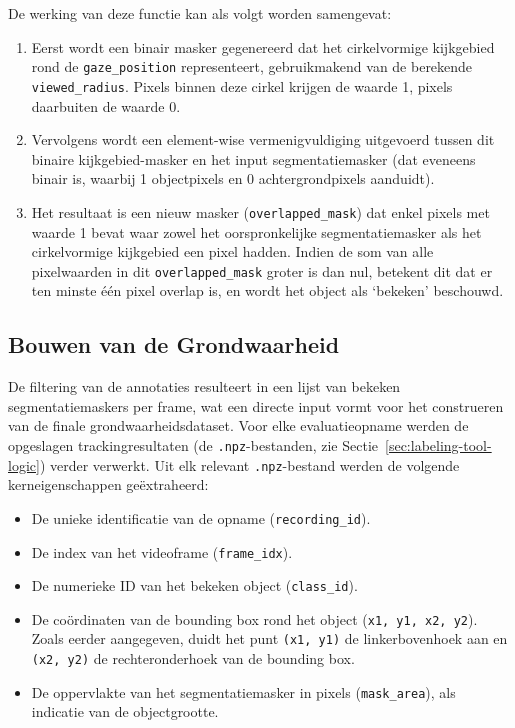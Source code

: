 De werking van deze functie kan als volgt worden samengevat:
\begin{enumerate}
  \item Eerst wordt een binair masker gegenereerd dat het cirkelvormige kijkgebied rond de \texttt{gaze\_position} representeert, 
  gebruikmakend van de berekende\\ \texttt{viewed\_radius}. Pixels binnen deze cirkel krijgen de waarde 1, pixels daarbuiten de waarde 0.
  \item Vervolgens wordt een element-wise vermenigvuldiging uitgevoerd tussen dit binaire kijkgebied-masker 
  en het input segmentatiemasker (dat eveneens binair is, waarbij 1 objectpixels en 0 achtergrondpixels aanduidt). 
  \item Het resultaat is een nieuw masker (\texttt{overlapped\_mask}) dat enkel pixels met waarde 1 bevat waar 
  zowel het oorspronkelijke segmentatiemasker als het cirkelvormige kijkgebied een pixel hadden. 
  Indien de som van alle pixelwaarden in dit \texttt{overlapped\_mask} groter is dan nul, 
  betekent dit dat er ten minste één pixel overlap is, en wordt het object als `bekeken' beschouwd.
\end{enumerate}

\subsection{Bouwen van de Grondwaarheid}

De filtering van de annotaties resulteert in een lijst van bekeken segmentatiemaskers per frame,
wat een directe input vormt voor het construeren van de finale grondwaarheidsdataset.
Voor elke evaluatieopname werden de opgeslagen trackingresultaten 
(de \texttt{.npz}-bestanden, zie Sectie~\ref{sec:labeling-tool-logic}) verder verwerkt. 
Uit elk relevant \texttt{.npz}-bestand werden de volgende kerneigenschappen geëxtraheerd:
\begin{itemize}
  \item De unieke identificatie van de opname (\texttt{recording\_id}).
  \item De index van het videoframe (\texttt{frame\_idx}).
  \item De numerieke ID van het bekeken object (\texttt{class\_id}).
  \item De coördinaten van de bounding box rond het object (\texttt{x1, y1, x2, y2}). Zoals eerder aangegeven, duidt het punt \texttt{(x1, y1)} de linkerbovenhoek aan en \texttt{(x2, y2)} de rechteronderhoek van de bounding box.
  \item De oppervlakte van het segmentatiemasker in pixels (\texttt{mask\_area}), als indicatie van de objectgrootte.
\end{itemize}

